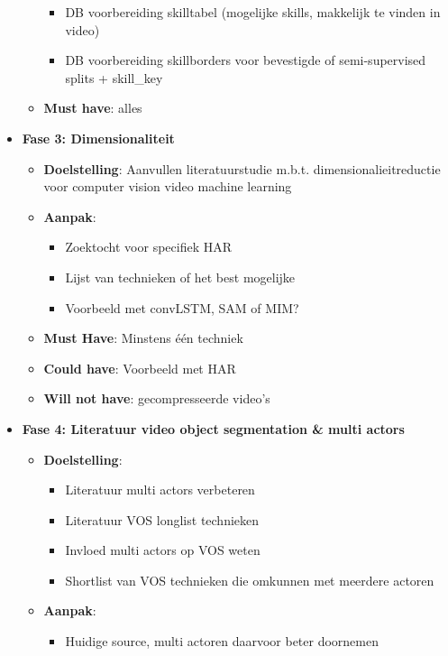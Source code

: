 \begin{itemize}
\begin{itemize}
\begin{itemize}
            \item DB voorbereiding skilltabel (mogelijke skills, makkelijk te vinden in video)
            \item DB voorbereiding skillborders voor bevestigde of semi-supervised splits + skill\_key
        \end{itemize}
        \item \textbf{Must have}: alles
    \end{itemize}
    \item \textbf{Fase 3: Dimensionaliteit}
    \begin{itemize}
        \item \textbf{Doelstelling}: Aanvullen literatuurstudie m.b.t. dimensionalieitreductie voor computer vision video machine learning
        \item \textbf{Aanpak}:
        \begin{itemize}
            \item Zoektocht voor specifiek HAR
            \item Lijst van technieken of het best mogelijke
            \item Voorbeeld met convLSTM, SAM of MIM?
        \end{itemize}
        \item \textbf{Must Have}: Minstens één techniek
        \item \textbf{Could have}: Voorbeeld met HAR
        \item \textbf{Will not have}: gecompresseerde video's
    \end{itemize}
    \item \textbf{Fase 4: Literatuur video object segmentation \& multi actors}
    \begin{itemize}
        \item \textbf{Doelstelling}:
        \begin{itemize}
            \item Literatuur multi actors verbeteren
            \item Literatuur VOS longlist technieken
            \item Invloed multi actors op VOS weten
            \item Shortlist van VOS technieken die omkunnen met meerdere actoren
        \end{itemize}
        \item \textbf{Aanpak}:
        \begin{itemize}
            \item Huidige source, multi actoren daarvoor beter doornemen

\end{itemize}
\end{itemize}
\end{itemize}
